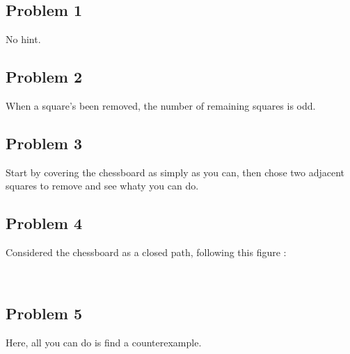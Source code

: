 \documentclass[12pt,a4paper,article,english,firamath]{nsi}
\begin{document}
\subsection*{Problem 1}

No hint.\\[4em]

\subsection*{Problem 2}

When a square's been removed, the number of remaining squares is odd.\\[4em]

\subsection*{Problem 3}

Start by covering the chessboard as simply as you can, then chose two adjacent squares to remove and see whaty you can do.\\[4em]

\subsection*{Problem 4}

Considered the chessboard as a closed path, following this figure :
\begin{center}
\\[4em]
\end{center}

\subsection*{Problem 5}

Here, all you can do is find a counterexample.\\[4em]
\end{document}
